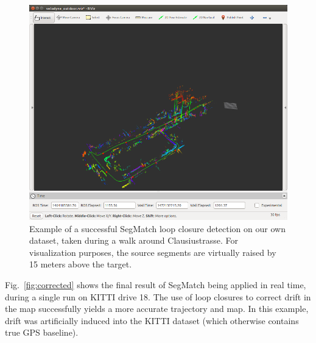 \begin{figure}
  \centering
  \includegraphics[width=5.2in]{images/clausius2.png}
  \caption{Example of a successful SegMatch loop closure detection on our own dataset, taken during a walk around Clausiustrasse. For visualization purposes, the source segments are virtually raised by 15 meters above the target.}
  \label{fig:clausius2}
\end{figure}

Fig.~\ref{fig:corrected} shows the final result of SegMatch being applied in real time, during a single run on KITTI drive 18. The use of loop closures to correct drift in the map successfully yields a more accurate trajectory and map. In this example, drift was artificially induced into the KITTI dataset (which otherwise contains true GPS baseline).\\

